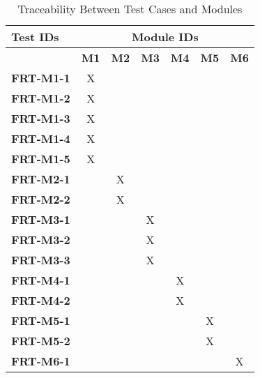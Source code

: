 \documentclass[12pt, titlepage]{article}
\begin{document}
\begin{longtable}{|l|cccccc|}
	\caption{Traceability Between Test Cases and Modules}                                                                                             \\
	\hline
	\textbf{Test IDs}  & \multicolumn{6}{c|}{\textbf{Module IDs}}                                                                                     \\
	\hline
	~                  & \textbf{M1}                              & \textbf{M2} & \textbf{M3} & \textbf{M4} & \textbf{M5} & \textbf{M6} \\
	\hline
	\textbf{FRT-M1-1}  & X                                        & ~           & ~           & ~           & ~ & ~ \\
	\textbf{FRT-M1-2}  & X                                        & ~           & ~           & ~           & ~ & ~ \\
	\textbf{FRT-M1-3}  & X                                        & ~           & ~           & ~           & ~  & ~\\
	\textbf{FRT-M1-4}  & X                                        & ~           & ~           & ~           & ~  & ~ \\
	\textbf{FRT-M1-5}  & X                                        & ~           & ~           & ~           & ~  & ~ \\
	\textbf{FRT-M2-1}  & ~                                        & X           & ~           & ~           & ~  & ~ \\
	\textbf{FRT-M2-2}  & ~                                        & X           & ~           & ~           & ~   & ~\\
	\textbf{FRT-M3-1}  & ~                                        & ~           & X           & ~           & ~   & ~\\
	\textbf{FRT-M3-2}  & ~                                        & ~           & X           & ~           & ~  & ~ \\
	\textbf{FRT-M3-3}  & ~                                        & ~           & X           & ~           & ~  & ~ \\
  \textbf{FRT-M4-1}  & ~                                        & ~           & ~           & X           & ~   & ~\\
	\textbf{FRT-M4-2}  & ~                                        & ~           & ~           & X           & ~   & ~\\
	\textbf{FRT-M5-1}  & ~                                        & ~           & ~           & ~           & X  & ~ \\
	\textbf{FRT-M5-2}  & ~                                        & ~           & ~           & ~           & X  & ~ \\
	\textbf{FRT-M6-1}  & ~                                        & ~           & ~           & ~           & ~  & X \\
	\hline
\end{longtable}
\end{document}
